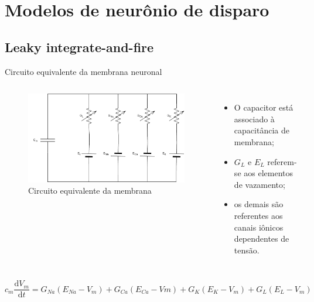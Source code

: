 \section{Modelos de neurônio de disparo}
\subsection{Leaky integrate-and-fire}
\begin{frame}{Circuito equivalente da membrana neuronal}
	\begin{columns}[t]
		\column{5cm}
			\begin{figure}[htb!]
				\centering
				\caption{Circuito equivalente da membrana}
				\label{fig:circuitomembrana}
				\includegraphics[width=\linewidth]{figs/circuito_membrana}
			\end{figure}
		\column{5cm}
			\begin{itemize}
				\item O capacitor está associado à capacitância de membrana;
				\item $G_L$ e $E_L$ referem-se aos elementos de vazamento;
				\item os demais são referentes aos canais iônicos dependentes de tensão.
			\end{itemize}
	\end{columns}
	\vfill
	\[
		c_m\frac{\mathrm{d}V_m}{\mathrm{d}t}=G_{Na}(E_{Na}-V_m)+G_{Ca}(E_{Ca}-Vm)+G_K(E_K-V_m)+G_L(E_L-V_m)
	\]
\end{frame}

